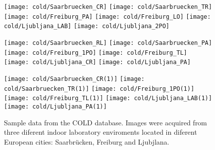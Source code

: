 
\begin{figure}[!h]
\label{fig:cold-database-sample}
\begin{center}
\texttt{[image: cold/Saarbruecken\_CR]}
\texttt{[image: cold/Saarbruecken\_TR]}
\texttt{[image: cold/Freiburg\_PA]}
\texttt{[image: cold/Freiburg\_LO]}
\texttt{[image: cold/Ljubljana\_LAB]}
\texttt{[image: cold/Ljubljana\_2PO]}

\texttt{[image: cold/Saarbruecken\_RL]}
\texttt{[image: cold/Saarbruecken\_PA]}
\texttt{[image: cold/Freiburg\_1PO]}
\texttt{[image: cold/Freiburg\_TL]}
\texttt{[image: cold/Ljubljana\_CR]}
\texttt{[image: cold/Ljubljana\_PA]}

\texttt{[image: cold/Saarbruecken\_CR(1)]}
\texttt{[image: cold/Saarbruecken\_TR(1)]}
\texttt{[image: cold/Freiburg\_1PO(1)]}
\texttt{[image: cold/Freiburg\_TL(1)]}
\texttt{[image: cold/Ljubljana\_LAB(1)]}
\texttt{[image: cold/Ljubljana\_PA(1)]}
\end{center}
\caption{Sample data from the COLD database. Images were acquired from three diferent indoor laboratory enviroments located in diferent European cities: Saarbrücken, Freiburg and Ljubjlana.}
\end{figure}

